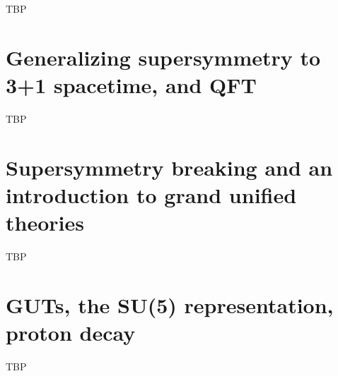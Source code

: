 \documentclass[]{article}
\begin{document}
TBP

\section{Generalizing supersymmetry to 3+1 spacetime, and QFT}

TBP

\section{Supersymmetry breaking and an introduction to grand unified theories}

TBP

\section{GUTs, the SU(5) representation, proton decay}

TBP



\raggedright

\end{document}
